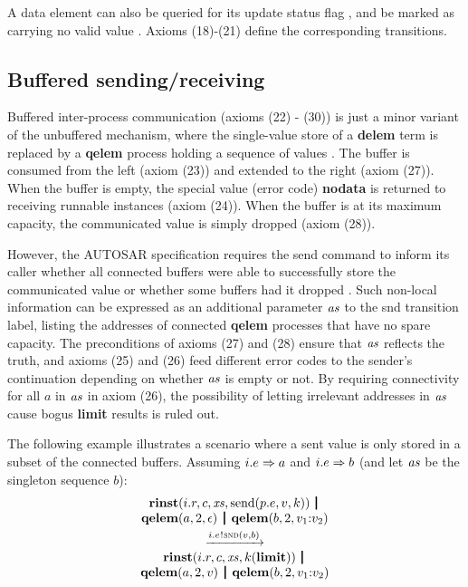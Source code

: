 \documentclass[10pt,conference]{IEEEtran}
\begin{document}
A data element can also be queried for its update status flag \cite[ch.~5.6.35]{AR:RTE}, and be marked as carrying no valid value \cite[ch.~5.6.7]{AR:RTE}. Axioms (18)-(21) define the corresponding transitions.

\subsection{Buffered sending/receiving} \label{sect:BufSndRcv}

Buffered inter-process communication (axioms (22) - (30)) is just a minor variant of the unbuffered mechanism, where the single-value store of a \textbf{delem} term is replaced by a \textbf{qelem} process holding a sequence of values \cite[ch.~4.3.1.10.2]{AR:RTE}. The buffer is consumed from the left (axiom (23)) and extended to the right (axiom (27)). When the buffer is empty, the special value (error code) \textbf{nodata} is returned to receiving runnable instances (axiom (24)). When the buffer is at its maximum capacity, the communicated value is simply dropped (axiom (28)).

However, the AUTOSAR specification requires the send command to inform its caller whether all connected buffers were able to successfully store the communicated value or whether some buffers had it dropped \cite[ch.~5.6.5]{AR:RTE}. Such non-local information can be expressed as an additional parameter $\Tvar{as}$ to the {\sc snd} transition label, listing the addresses of connected \textbf{qelem} processes that have no spare capacity. The preconditions of axioms (27) and (28) ensure that $\Tvar{as}$ reflects the truth, and axioms (25) and (26) feed different error codes to the sender's continuation depending on whether $\Tvar{as}$ is empty or not. By requiring connectivity for all $a$ in $\Tvar{as}$ in axiom (26), the possibility of letting irrelevant addresses in $\Tvar{as}$ cause bogus \textbf{limit} results is ruled out.

The following example illustrates a scenario where a sent value is only stored in a subset of the connected buffers. Assuming $i.e \Rightarrow a$ and $i.e \Rightarrow b$ (and let $\Tvar{as}$ be the singleton sequence $b$):
$$
\begin{array}{c}
  \Trinst {i.r} c \Xs {\TrteSend {p.e} v k} \,\Opar  \\
  {\Tqelem a 2 \Teps} \Opar {\Tqelem b 2 {\Tcons {v_1} {v_2}}} \vspace{0.6ex} \\
  \red{\say{i.e}{\Tsnd v b}} \\
  \Trinst {i.r} c \Xs {\Tap k \Tlimit} \,\Opar \\
  {\Tqelem a 2 v} \Opar {\Tqelem b 2 {\Tcons {v_1} {v_2}}}
\end{array}
$$
\end{document}
